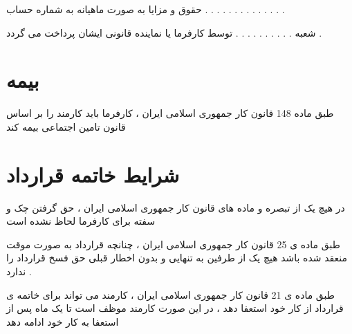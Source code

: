 \documentclass[12pt]{article}
\begin{document}
حقوق و مزایا به صورت ماهیانه به شماره حساب  . . . . . . . . . . . . . .

شعبه . . . . . . . . . . توسط کارفرما یا نماینده قانونی ایشان پرداخت می گردد .


\section{بیمه}

طبق ماده 148 قانون کار جمهوری اسلامی ایران ، کارفرما باید کارمند را بر اساس قانون تامین اجتماعی بیمه کند 




\section{شرایط خاتمه قرارداد}

\begin{tcolorbox}[
title=تبصره 4
]
در هیچ یک از تبصره و ماده های قانون کار جمهوری اسلامی ایران ، حق گرفتن چک و سفته برای کارفرما لحاظ نشده است
\end{tcolorbox}


طبق ماده ی 25 قانون کار جمهوری اسلامی ایران ، چنانچه قرارداد به صورت موقت منعقد شده باشد هیچ یک از طرفین به تنهایی و بدون اخطار قبلی حق فسخ قرارداد را ندارد .

طبق ماده ی 21 قانون کار جمهوری اسلامی ایران ، کارمند می تواند برای خاتمه ی قرارداد از کار خود استعفا دهد ، در این صورت کارمند موظف است تا یک ماه پس از استعفا به کار خود ادامه دهد
\end{document}

